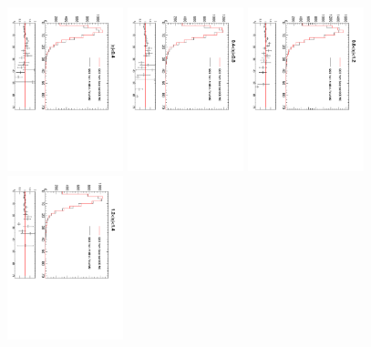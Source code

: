 \begin{figure}[htb]
  \begin{center}
    \includegraphics*[width=0.3\textwidth, angle=90]{MetCompare_anti_eta1.pdf}
    \includegraphics*[width=0.3\textwidth, angle=90]{MetCompare_anti_eta2.pdf}
    \includegraphics*[width=0.3\textwidth, angle=90]{MetCompare_anti_eta3.pdf}
    \includegraphics*[width=0.3\textwidth, angle=90]{MetCompare_anti_eta4.pdf}

\end{center}
\end{figure}
